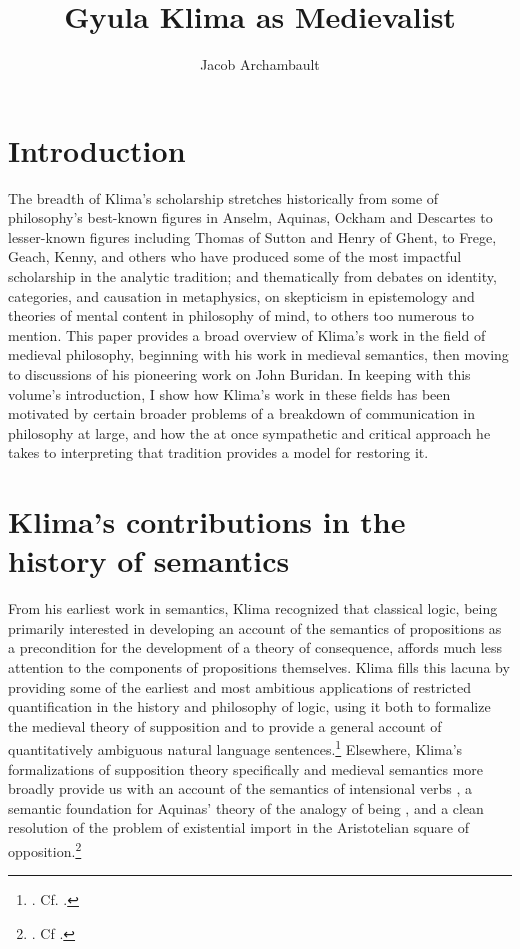 \documentclass[]{article}
\title{Gyula Klima as Medievalist}
\author{Jacob Archambault}
\begin{document}
\maketitle

\section{Introduction}
The breadth of Klima's scholarship stretches 
historically from some of philosophy's best-known figures in Anselm, Aquinas, Ockham and Descartes 
to lesser-known figures including Thomas of Sutton and Henry of Ghent, 
to Frege, Geach, Kenny, and others who have produced some of the most impactful scholarship in the analytic tradition; 
and 
thematically from debates 
on identity, categories, and causation in metaphysics, 
on skepticism in epistemology and theories of mental content in philosophy of mind, 
to others too numerous to mention. 
This paper provides a broad overview of Klima's work in the field of medieval philosophy, 
beginning with his work in medieval semantics, 
then moving to discussions of his pioneering work on John Buridan. 
In keeping with this volume's introduction, 
I show how Klima's work in these fields has been motivated by 
certain broader problems of a breakdown of communication in philosophy at large, 
and how the at once sympathetic and critical approach he takes to interpreting that tradition provides a model for restoring it.

\section{Klima's contributions in the history of semantics}
From his earliest work in semantics, 
Klima recognized that classical logic, 
being primarily interested in developing an account of the semantics of propositions as a precondition for the development of a theory of consequence, 
affords much less attention to the components of propositions themselves. 
Klima fills this lacuna by providing some of the earliest and most ambitious applications of restricted quantification in the history and philosophy of logic, 
using it both to formalize the medieval theory of supposition 
and to provide a general account of quantitatively ambiguous natural language sentences.\footnote{\autocite{Klima1988,Klima1990,KlimaSandu1990,Klima1991b}. Cf. \autocite{Parsons2014}.} 
Elsewhere, 
Klima's formalizations of supposition theory specifically 
and medieval semantics more broadly 
provide us with an account of the semantics of intensional verbs \autocite{Klima1991}, 
a semantic foundation for Aquinas' theory of the analogy of being \autocite{Klima1996,Klima2002}, 
and a clean resolution of the problem of existential import in the Aristotelian square of opposition.\footnote{\autocite{Klima2001}. Cf \autocite{Read2015b}.} 
\end{document}
